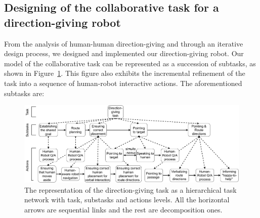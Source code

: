 \documentclass[a4paper,11pt,twoside]{StyleThese}
\begin{document}
\subsection{Designing of the collaborative task for a direction-giving robot}\label{sec:guiding}

From the analysis of human-human direction-giving and through an iterative design process, we designed and implemented our direction-giving robot. Our model of the collaborative task can be represented as a succession of subtasks, as shown in Figure~\ref{fig:chap3_HTN}. This figure also exhibits the incremental refinement of the task into a sequence of human-robot interactive actions. The aforementioned subtasks are:

\begin{figure}[!t]
	\centering
	\includegraphics[width=\linewidth]{figures/chapter3/HTN-guiding_task.pdf}
	\caption{The representation of the direction-giving task as a hierarchical task network with task, substasks and actions levels. All the horizontal arrows are sequential links and the rest are decomposition ones.}
	\label{fig:chap3_HTN}
\end{figure}
\end{document}
